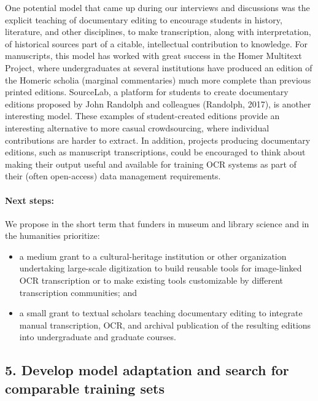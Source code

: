 \documentclass[twoside,11pt]{report}
\begin{document}
One potential model that came up during our interviews and discussions was the explicit teaching of documentary editing to encourage students in history, literature, and other disciplines, to make transcription, along with interpretation, of historical sources part of a citable, intellectual contribution to knowledge. For manuscripts, this model has worked with great success in the Homer Multitext Project, where undergraduates at several institutions have produced an edition of the Homeric scholia (marginal commentaries) much more complete than previous printed editions. SourceLab, a platform for students to create documentary editions proposed by John Randolph and colleagues (Randolph, 2017), is another interesting model. These examples of student-created editions provide an interesting alternative to more casual crowdsourcing, where individual contributions are harder to extract. In addition, projects producing documentary editions, such as manuscript transcriptions, could be encouraged to think about making their output useful and available for training OCR systems as part of their (often open-access) data management requirements.

\paragraph{Next steps:} We propose in the short term that funders in museum and library science and in the humanities prioritize:
\begin{itemize}

\item a medium grant to a cultural-heritage institution or other organization undertaking large-scale digitization to build reusable tools for image-linked OCR transcription or to make existing tools customizable by different transcription communities; and

\item a small grant to textual scholars teaching documentary editing to integrate manual transcription, OCR, and archival publication of the resulting editions into undergraduate and graduate courses.

\end{itemize}

\subsection{5. Develop model adaptation and search for comparable training sets}
\label{sec:rec-adaptation}
\end{document}

